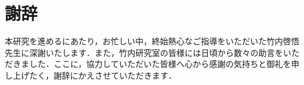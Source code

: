 \chapter*{謝辞}
本研究を進めるにあたり，お忙しい中，終始熱心なご指導をいただいた竹内啓悟先生に深謝いたします．また，竹内研究室の皆様には日頃から数々の助言をいただきました．ここに，協力していただいた皆様へ心から感謝の気持ちと御礼を申し上げたく，謝辞にかえさせていただきます． 　